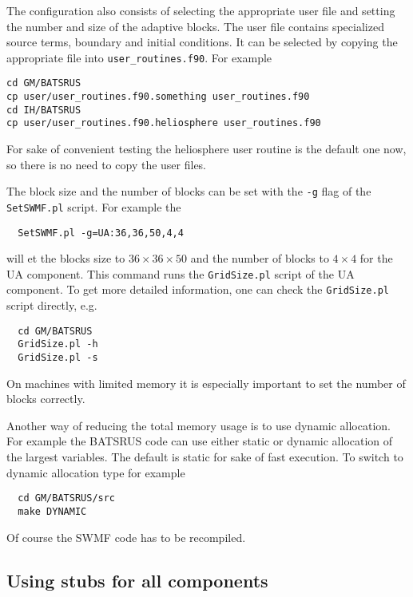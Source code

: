 The configuration also consists of selecting the 
appropriate user file and setting the number and size of the
adaptive blocks. The user file contains specialized
source terms, boundary and initial conditions. It can be 
selected by copying the appropriate file into {\tt user\_routines.f90}.
For example
\begin{verbatim}
cd GM/BATSRUS
cp user/user_routines.f90.something user_routines.f90
cd IH/BATSRUS
cp user/user_routines.f90.heliosphere user_routines.f90
\end{verbatim}
For sake of convenient testing the heliosphere user routine is
the default one now, so there is no need to copy the user files.

The block size and the number of blocks can be set with the 
{\tt -g} flag of the {\tt SetSWMF.pl} script.
For example the
\begin{verbatim}
  SetSWMF.pl -g=UA:36,36,50,4,4
\end{verbatim}
will et the blocks size to $36\times 36\times 50$ and the number of blocks to 
$4\times 4$ for the UA component. This command runs the {\tt GridSize.pl}
script of the UA component. To get more detailed information, one can
check the {\tt GridSize.pl} script directly, e.g.
\begin{verbatim}
  cd GM/BATSRUS
  GridSize.pl -h
  GridSize.pl -s
\end{verbatim}
On machines with limited memory it is especially important to
set the number of blocks correctly. 

Another way of reducing the total memory usage is to use dynamic
allocation. For example the BATSRUS code can use either static or
dynamic allocation of the largest variables. The default is static
for sake of fast execution. To switch to dynamic allocation type
for example
\begin{verbatim}
  cd GM/BATSRUS/src
  make DYNAMIC
\end{verbatim}
Of course the SWMF code has to be recompiled.

\subsection{Using stubs for all components}

